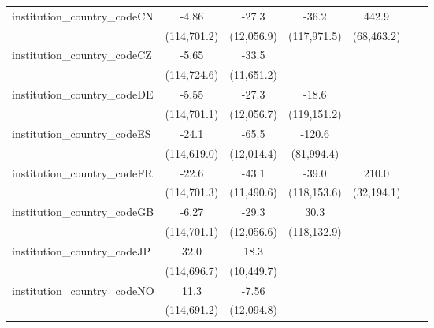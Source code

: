 \begin{tabular}{lcccccc}
   institution\_country\_codeCN          & -4.86        & -27.3        & -36.2        & 442.9        &                &   \\   
                                         & (114,701.2)  & (12,056.9)   & (117,971.5)  & (68,463.2)   &                &   \\   
   institution\_country\_codeCZ          & -5.65        & -33.5        &              &              &                &   \\   
                                         & (114,724.6)  & (11,651.2)   &              &              &                &   \\   
   institution\_country\_codeDE          & -5.55        & -27.3        & -18.6        &              &                &   \\   
                                         & (114,701.1)  & (12,056.7)   & (119,151.2)  &              &                &   \\   
   institution\_country\_codeES          & -24.1        & -65.5        & -120.6       &              &                &   \\   
                                         & (114,619.0)  & (12,014.4)   & (81,994.4)   &              &                &   \\   
   institution\_country\_codeFR          & -22.6        & -43.1        & -39.0        & 210.0        &                &   \\   
                                         & (114,701.3)  & (11,490.6)   & (118,153.6)  & (32,194.1)   &                &   \\   
   institution\_country\_codeGB          & -6.27        & -29.3        & 30.3         &              &                &   \\   
                                         & (114,701.1)  & (12,056.6)   & (118,132.9)  &              &                &   \\   
   institution\_country\_codeJP          & 32.0         & 18.3         &              &              &                &   \\   
                                         & (114,696.7)  & (10,449.7)   &              &              &                &   \\   
   institution\_country\_codeNO          & 11.3         & -7.56        &              &              &                &   \\   
                                         & (114,691.2)  & (12,094.8)   &              &              &                &   \\   

\end{tabular}
